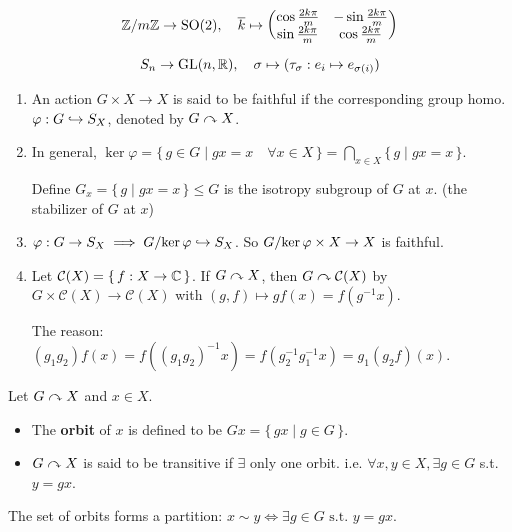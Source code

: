 \begin{example}
  \[
    {\mathbb{Z}}/{m\mathbb{Z}} \to \text{SO}(2), \quad
    \overline{k} \mapsto \begin{pmatrix}
      \cos \frac{2k\pi}{m} & -\sin \frac{2k\pi}{m} \\
      \sin \frac{2k\pi}{m} & \cos \frac{2k\pi}{m}
    \end{pmatrix}
  \]
\end{example}

\begin{example}
  \[
    S_n \to \text{GL}(n, \mathbb{R}), \quad
    \sigma \mapsto (\tau_\sigma: e_i \mapsto e_{\sigma(i)})
  \]
\end{example}

\begin{remark} \mbox{}
  \begin{enumerate}
    \item An action $G \times X \to X$ is said to be faithful if the
      corresponding group homo. $\varphi: G \hookrightarrow S_X$, denoted by
      $G \curvearrowright X$.
    \item In general, $\ker \varphi = \{\, g \in G \mid gx = x \quad
      \forall x \in X \,\} = \bigcap_{x \in X} \{\, g \mid gx = x \,\}$.

      Define $G_x = \{\, g \mid gx = x \,\} \le G$ is the isotropy subgroup
      of $G$ at $x$. (the stabilizer of $G$ at $x$)
    \item $\varphi: G \to S_X \implies {G}/{\ker \varphi} \hookrightarrow S_X$.
      So ${G}/{\ker \varphi} \times X \to X$ is faithful.
    \item Let $\mathcal{C}(X) = \{\, f: X \to \mathbb{C} \,\}$. If $G \curvearrowright X$, then
      $G \curvearrowright \mathcal{C}(X)$ by
      $G \times \mathcal{C}(X) \to \mathcal{C}(X)$ with
      $(g, f) \mapsto g f(x) = f(g^{-1}x)$.

      The reason: $(g_1g_2)f(x) = f((g_1g_2)^{-1}x) = f(g_2^{-1}g_1^{-1}x)
      = g_1(g_2 f)(x)$.
  \end{enumerate}
\end{remark}

\begin{definition}
  Let $G \curvearrowright X$ and $x \in X$.
  \begin{itemize}
    \item The {\bf orbit} of $x$ is defined to be
      $Gx = \{\, gx \mid g \in G \,\}$.
    \item $G \curvearrowright X$ is said to be transitive if $\exists$ only one orbit.
      i.e. $\forall x, y \in X, \exists g \in G$ s.t. $y = gx$.
  \end{itemize}
  The set of orbits forms a partition: $x \sim y \iff \exists g \in G
  \text{~s.t.~} y = gx$.
\end{definition}

